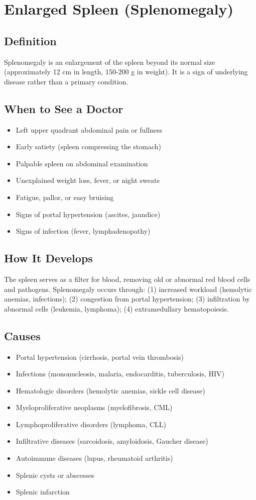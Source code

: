 \chapter{Enlarged Spleen (Splenomegaly)}

\section*{Definition}
Splenomegaly is an enlargement of the spleen beyond its normal size (approximately 12 cm in length, 150-200 g in weight). It is a sign of underlying disease rather than a primary condition.

\section*{When to See a Doctor}
\begin{itemize}
\item Left upper quadrant abdominal pain or fullness
\item Early satiety (spleen compressing the stomach)
\item Palpable spleen on abdominal examination
\item Unexplained weight loss, fever, or night sweats
\item Fatigue, pallor, or easy bruising
\item Signs of portal hypertension (ascites, jaundice)
\item Signs of infection (fever, lymphadenopathy)
\end{itemize}

\section*{How It Develops}
The spleen serves as a filter for blood, removing old or abnormal red blood cells and pathogens. Splenomegaly occurs through: (1) increased workload (hemolytic anemias, infections); (2) congestion from portal hypertension; (3) infiltration by abnormal cells (leukemia, lymphoma); (4) extramedullary hematopoiesis.

\section*{Causes}
\begin{itemize}
\item Portal hypertension (cirrhosis, portal vein thrombosis)
\item Infections (mononucleosis, malaria, endocarditis, tuberculosis, HIV)
\item Hematologic disorders (hemolytic anemias, sickle cell disease)
\item Myeloproliferative neoplasms (myelofibrosis, CML)
\item Lymphoproliferative disorders (lymphoma, CLL)
\item Infiltrative diseases (sarcoidosis, amyloidosis, Gaucher disease)
\item Autoimmune diseases (lupus, rheumatoid arthritis)
\item Splenic cysts or abscesses
\item Splenic infarction
\end{itemize}

